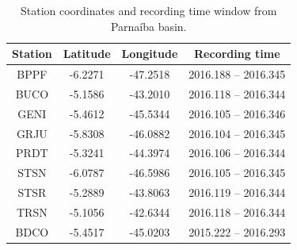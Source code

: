 \documentclass[manuscript,11pt]{geophysics}
\begin{document}
\begin{table}[! htpb]
\centering
	\small
	\begin{threeparttable}
	\caption{Station coordinates and recording time window from Parnaíba basin.}
	\begin{tabular}{c c c c}
    \hline
    Station & Latitude & Longitude & Recording time \\ \hline
    BPPF & -6.2271 & -47.2518 & 2016.188 – 2016.345 \\
	BUCO & -5.1586 & -43.2010 & 2016.118 – 2016.344 \\
	GENI & -5.4612 & -45.5344 & 2016.105 – 2016.346 \\
	GRJU & -5.8308 & -46.0882 & 2016.104 – 2016.345 \\
	PRDT & -5.3241 & -44.3974 & 2016.106 – 2016.344 \\
	STSN & -6.0787 & -46.5986 & 2016.105 – 2016.345 \\
	STSR & -5.2889 & -43.8063 & 2016.119 – 2016.344 \\
	TRSN & -5.1056 & -42.6344 & 2016.118 – 2016.344 \\
	BDCO & -5.4517 & -45.0203 & 2015.222 – 2016.293 \\ \hline
    \end{tabular}
    \label{tabela_estacoes}
	\end{threeparttable}
\end{table}
\end{document}
